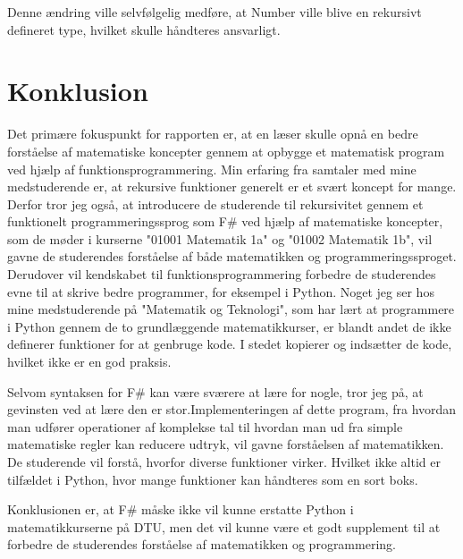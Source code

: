 \documentclass{article}
\newcommand{\newchapter}{
    \cleardoublepage
    \ifthenelse{\isodd{\value{page}}}{}{\hbox{}\newpage}
}
\begin{document}
Denne ændring ville selvfølgelig medføre, at Number ville blive en rekursivt defineret type, hvilket skulle håndteres ansvarligt.

\newchapter
\section{Konklusion}
Det primære fokuspunkt for rapporten er, at en læser skulle opnå en bedre forståelse af matematiske koncepter gennem at opbygge et matematisk program ved hjælp af funktionsprogrammering. Min erfaring fra samtaler med mine medstuderende er, at rekursive funktioner generelt er et svært koncept for mange. Derfor tror jeg også, at introducere de studerende til rekursivitet gennem et funktionelt programmeringssprog som F\# ved hjælp af matematiske koncepter, som de møder i kurserne "01001 Matematik 1a" og "01002 Matematik 1b", vil gavne de studerendes forståelse af både matematikken og programmeringssproget. Derudover vil kendskabet til funktionsprogrammering forbedre de studerendes evne til at skrive bedre programmer, for eksempel i Python. Noget jeg ser hos mine medstuderende på "Matematik og Teknologi", som har lært at programmere i Python gennem de to grundlæggende matematikkurser, er blandt andet de ikke definerer funktioner for at genbruge kode. I stedet kopierer og indsætter de kode, hvilket ikke er en god praksis.


Selvom syntaksen for F\# kan være sværere at lære for nogle, tror jeg på, at gevinsten ved at lære den er stor.Implementeringen af dette program, fra hvordan man udfører operationer af komplekse tal til hvordan man ud fra simple matematiske regler kan reducere udtryk, vil gavne forståelsen af matematikken. De studerende vil forstå, hvorfor diverse funktioner virker. Hvilket ikke altid er tilfældet i Python, hvor mange funktioner kan håndteres som en sort boks.


Konklusionen er, at F\# måske ikke vil kunne erstatte Python i matematikkurserne på DTU, men det vil kunne være et godt supplement til at forbedre de studerendes forståelse af matematikken og programmering.


\newpage
\printbibliography

\newpage

\end{document}
